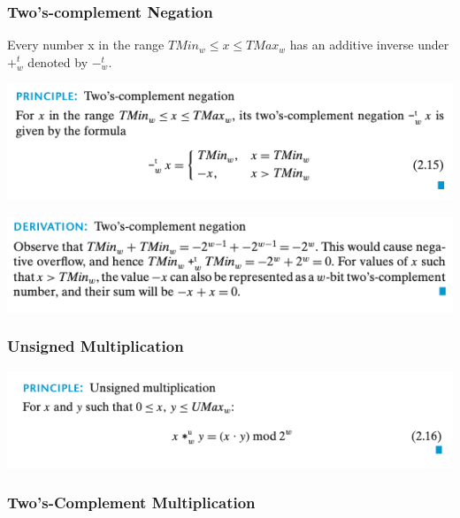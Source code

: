 \documentclass[11pt]{article}
\begin{document}
\subsubsection{Two's-complement Negation}
\label{sec:orgd6a4b9d}
Every number x in the range \(TMin_w \le x \le TMax_w\) has an additive inverse under \(+_w^t\) denoted by \(-_w^t\).\\

\begin{center}
\includegraphics[width=.9\linewidth]{pics/two's-complement-negation.png}
\end{center}

\begin{center}
\includegraphics[width=.9\linewidth]{pics/derivation-two's-complement-negation.png}
\end{center}



\subsubsection{Unsigned Multiplication}
\label{sec:org8cd1798}

\begin{center}
\includegraphics[width=.9\linewidth]{pics/unsigned-multiplication.png}
\end{center}


\subsubsection{Two's-Complement Multiplication}
\label{sec:orgff26760}
\end{document}
